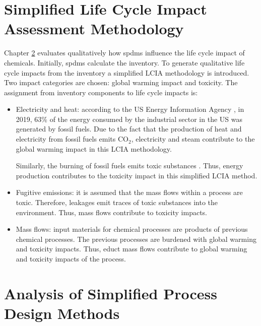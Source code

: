 \section{Simplified Life Cycle Impact Assessment Methodology}
\label{chap:lcia-meth}
Chapter \ref{analysis-spdm} evaluates qualitatively how \aclp{spdm} influence the life cycle impact of chemicals. Initially, \aclp{spdm} calculate the inventory. To generate qualitative life cycle impacts from the inventory a simplified LCIA methodology is introduced. Two impact categories are chosen: global warming impact and toxicity. %
The assignment from inventory components to life cycle impacts is:
\begin{itemize}
    \item Electricity and heat: according to the US Energy Information Agency \cite{U.S.EnergyInformationAdministration.202003}, in 2019,  63\% of the energy consumed by the industrial sector in the US was generated by fossil fuels. Due to the fact that the production of heat and electricity from fossil fuels emits CO$_2$, electricity and steam contribute to the global warming impact in this LCIA methodology.
    
    Similarly, the burning of  fossil fuels emits toxic substances \cite{FitzGerald.}. Thus, energy production contributes to the toxicity impact in this simplified LCIA method.
    \item Fugitive emissions: it is assumed that the mass flows within a process are toxic. Therefore, leakages emit traces of toxic substances into the environment. Thus, mass flows contribute to toxicity impacts.
    \item Mass flows: input materials for chemical processes are products of previous chemical processes. The previous processes are burdened with global warming and toxicity impacts. %
    Thus, educt mass flows contribute to global warming and toxicity impacts of the process.
\end{itemize}

\section{Analysis of Simplified Process Design Methods}
\label{analysis-spdm}

